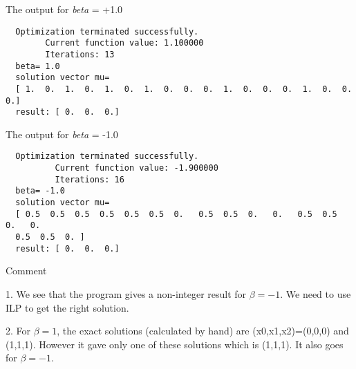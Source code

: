 \documentclass[12pt,a4paper]{scrartcl}
\begin{document}
The output for \textit{beta} = +1.0
\begin{verbatim}
  Optimization terminated successfully.
        Current function value: 1.100000    
        Iterations: 13
  beta= 1.0
  solution vector mu=
  [ 1.  0.  1.  0.  1.  0.  1.  0.  0.  0.  1.  0.  0.  0.  1.  0.  0.  0.]
  result: [ 0.  0.  0.]
\end{verbatim}

The output for \textit{beta} = -1.0
\begin{verbatim}
  Optimization terminated successfully.
          Current function value: -1.900000   
          Iterations: 16
  beta= -1.0
  solution vector mu=
  [ 0.5  0.5  0.5  0.5  0.5  0.5  0.   0.5  0.5  0.   0.   0.5  0.5  0.   0.
  0.5  0.5  0. ]
  result: [ 0.  0.  0.]
\end{verbatim}

Comment


1. We see that the program gives a non-integer result for $\beta=-1$. We need to use ILP to get the right solution.


2. For \(\beta=1\), the exact solutions (calculated by hand) are (x0,x1,x2)=(0,0,0) and (1,1,1). However it gave only one of these solutions which is (1,1,1). It also goes for \(\beta=-1\).
\clearpage

\end{document}
